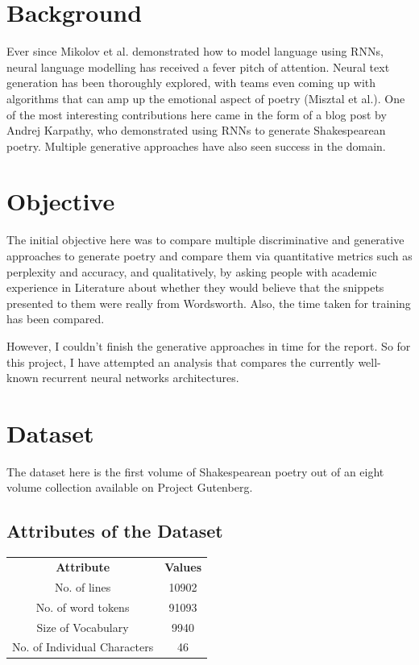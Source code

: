 \documentclass[15pt]{article}
\begin{document}
\section{Background}
Ever since Mikolov et al. demonstrated how to model language using RNNs, neural language modelling has received a fever pitch of attention. Neural text generation has been thoroughly explored, with teams even coming up with algorithms that can amp up the emotional aspect of poetry (Misztal et al.).  One of the most interesting contributions here came in the form of a blog post by Andrej Karpathy, who demonstrated using RNNs to generate Shakespearean poetry. Multiple generative approaches have also seen success in the domain.

\section{Objective}
The initial objective here was to compare multiple discriminative and generative approaches to generate poetry and compare them via quantitative metrics such as perplexity and accuracy, and qualitatively, by asking people with academic experience in Literature about whether they would believe that the snippets presented to them were really from Wordsworth. Also, the time taken for training has been compared.

However, I couldn't finish the generative approaches in time for the report. So for this project, I have attempted an analysis that compares the currently well-known recurrent neural networks architectures.


\section{Dataset}
The dataset here is the first volume of Shakespearean poetry out of an eight volume collection available on Project Gutenberg.  
\subsection{Attributes of the Dataset}
\begin{center}
\begin{tabular}{c c}
\textbf{Attribute} & \textbf{Values} \\
No. of lines & 10902 \\
No. of word tokens & 91093 \\
Size of Vocabulary & 9940 \\
No. of Individual Characters & 46
\end{tabular}
\end{center}
\end{document}
